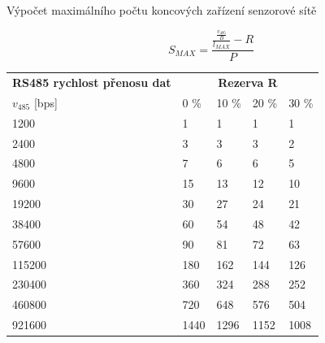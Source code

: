 \documentclass{beamer}
\begin{document}
\begin{frame} {Výpočet maximálního počtu koncových zařízení senzorové sítě}

	\vspace{-12pt}

	\begin{equation}
		S_{MAX} = \frac{\frac{\frac{v_{485}}{B}}{l_{MAX}} - R}{P}
		\end{equation}
		
	\fontsize{10}{12}\selectfont 

		


	\begin{longtable} {|l|llll|}
			\hline
			\textbf{RS485 rychlost přenosu dat} &       \multicolumn{4}{c|}{\textbf{Rezerva R}}	  	    \\
			$v_{485}$ {[bps]}  &	0 \%	&	10 \%	&	20 \%	&	30 \%  \\ \hline
		
			1200~~~ &    1	&    1	&    1	&    1 \\
			2400~~~ &    3	&    3	&    3	&    2 \\
			4800~~~ &    7	&    6	&    6	&    5 \\
			9600~~~ &   15	&   13	&   12	&   10 \\
			19200~~~ &   30	&   27	&   24	&   21 \\
			38400~~~ &   60	&   54	&   48	&   42 \\
			57600~~~ &   90	&   81	&   72	&   63 \\
			115200~~~ &  180	&  162	&  144	&  126 \\
			230400~~~ &  360	&  324	&  288	&  252 \\
			460800~~~ &  720	&  648	&  576	&  504 \\
			921600~~~ & 1440	& 1296	& 1152	& 1008 \\
			\hline
		
		\end{longtable}
\end{frame}
\end{document}
